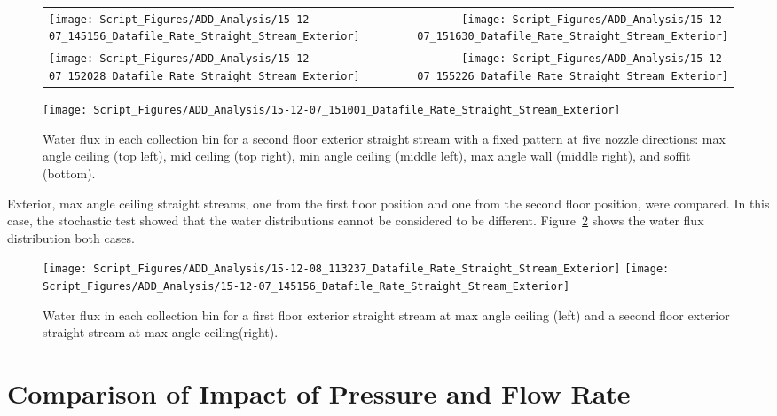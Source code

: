 \documentclass[12pt,oneside]{book}
\begin{document}
\begin{figure}[ht]
\begin{tabular*}{\textwidth}{lr}
\texttt{[image: Script\_Figures/ADD\_Analysis/15-12-07\_145156\_Datafile\_Rate\_Straight\_Stream\_Exterior]} &
\texttt{[image: Script\_Figures/ADD\_Analysis/15-12-07\_151630\_Datafile\_Rate\_Straight\_Stream\_Exterior]} \\
\texttt{[image: Script\_Figures/ADD\_Analysis/15-12-07\_152028\_Datafile\_Rate\_Straight\_Stream\_Exterior]} &
\texttt{[image: Script\_Figures/ADD\_Analysis/15-12-07\_155226\_Datafile\_Rate\_Straight\_Stream\_Exterior]} \\
\end{tabular*}
\centering
\texttt{[image: Script\_Figures/ADD\_Analysis/15-12-07\_151001\_Datafile\_Rate\_Straight\_Stream\_Exterior]}
\caption[Water Flux for Varying Nozzle Direction with Fixed Second Floor Exterior Straight Stream]{Water flux in each collection bin for a second floor exterior straight stream with a fixed pattern at five nozzle directions: max angle ceiling (top left), mid ceiling (top right), min angle ceiling (middle left), max angle wall (middle right), and soffit (bottom).}
\label{fig:Exterior_Second_Floor_Varying_Nozzle_Directions_SS_Fixed_Pattern}
\end{figure}

\clearpage
Exterior, max angle ceiling straight streams, one from the first floor position and one from the second floor position, were compared. In this case, the stochastic test showed that the water distributions cannot be considered to be different. Figure~\ref{fig:Exterior_First_Floor_Second_Floor} shows the water flux distribution both cases.

\begin{figure}[ht]
\texttt{[image: Script\_Figures/ADD\_Analysis/15-12-08\_113237\_Datafile\_Rate\_Straight\_Stream\_Exterior]}
\texttt{[image: Script\_Figures/ADD\_Analysis/15-12-07\_145156\_Datafile\_Rate\_Straight\_Stream\_Exterior]} \\ 
\caption[Water Flux for Same Nozzle Direction Varying Exterior Floor]{Water flux in each collection bin for a first floor exterior straight stream at max angle ceiling (left) and a second floor exterior straight stream at max angle ceiling(right).}
\label{fig:Exterior_First_Floor_Second_Floor}
\end{figure}

\section{Comparison of Impact of Pressure and  Flow Rate}
\end{document}
